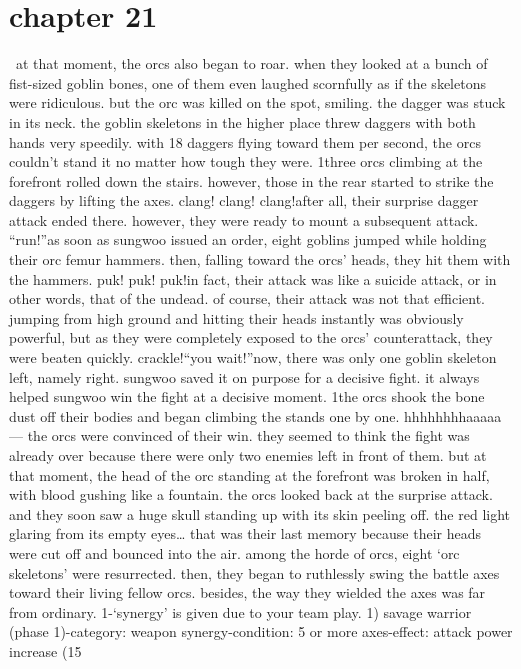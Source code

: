\section{chapter 21}






 at that moment, the orcs also began to roar.
 when they looked at a bunch of fist-sized goblin bones, one of them even laughed scornfully as if the skeletons were ridiculous.
 but the orc was killed on the spot, smiling.
 the dagger was stuck in its neck.
the goblin skeletons in the higher place threw daggers with both hands very speedily.
with 18 daggers flying toward them per second, the orcs couldn’t stand it no matter how tough they were.
1three orcs climbing at the forefront rolled down the stairs.
 however, those in the rear started to strike the daggers by lifting the axes.
clang! clang! clang!after all, their surprise dagger attack ended there.
 however, they were ready to mount a subsequent attack.
“run!”as soon as sungwoo issued an order, eight goblins jumped while holding their orc femur hammers.
 then, falling toward the orcs’ heads, they hit them with the hammers.
puk! puk! puk!in fact, their attack was like a suicide attack, or in other words, that of the undead.
of course, their attack was not that efficient.
 jumping from high ground and hitting their heads instantly was obviously powerful, but as they were completely exposed to the orcs’ counterattack, they were beaten quickly.
crackle!“you wait!”now, there was only one goblin skeleton left, namely right.
 sungwoo saved it on purpose for a decisive fight.
 it always helped sungwoo win the fight at a decisive moment.
1the orcs shook the bone dust off their bodies and began climbing the stands one by one.
hhhhhhhhaaaaa—
the orcs were convinced of their win.
 they seemed to think the fight was already over because there were only two enemies left in front of them.
but at that moment, the head of the orc standing at the forefront was broken in half, with blood gushing like a fountain.
the orcs looked back at the surprise attack.
 and they soon saw a huge skull standing up with its skin peeling off.
the red light glaring from its empty eyes… that was their last memory because their heads were cut off and bounced into the air.
among the horde of orcs, eight ‘orc skeletons’ were resurrected.
 then, they began to ruthlessly swing the battle axes toward their living fellow orcs.
 besides, the way they wielded the axes was far from ordinary.
1-‘synergy’ is given due to your team play.
1) savage warrior (phase 1)-category: weapon synergy-condition: 5 or more axes-effect: attack power increase (15%
